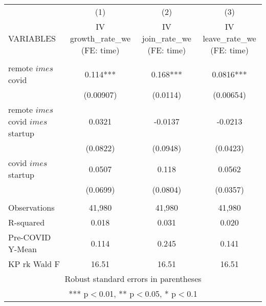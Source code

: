 \documentclass[]{article}
\begin{document}
\begin{tabular}{lccc} \hline
 & (1) & (2) & (3) \\
VARIABLES & IV growth\_rate\_we (FE: time) & IV join\_rate\_we (FE: time) & IV leave\_rate\_we (FE: time) \\ \hline
 &  &  &  \\
remote $	imes$ covid & 0.114*** & 0.168*** & 0.0816*** \\
 & (0.00907) & (0.0114) & (0.00654) \\
remote $	imes$ covid $	imes$ startup & 0.0321 & -0.0137 & -0.0213 \\
 & (0.0822) & (0.0948) & (0.0423) \\
covid $	imes$ startup & 0.0507 & 0.118 & 0.0562 \\
 & (0.0699) & (0.0804) & (0.0357) \\
 &  &  &  \\
Observations & 41,980 & 41,980 & 41,980 \\
R-squared & 0.018 & 0.031 & 0.020 \\
Pre-COVID Y-Mean & 0.114 & 0.245 & 0.141 \\
 KP rk Wald F & 16.51 & 16.51 & 16.51 \\ \hline
\multicolumn{4}{c}{ Robust standard errors in parentheses} \\
\multicolumn{4}{c}{ *** p$<$0.01, ** p$<$0.05, * p$<$0.1} \\
\end{tabular}
\end{document}
